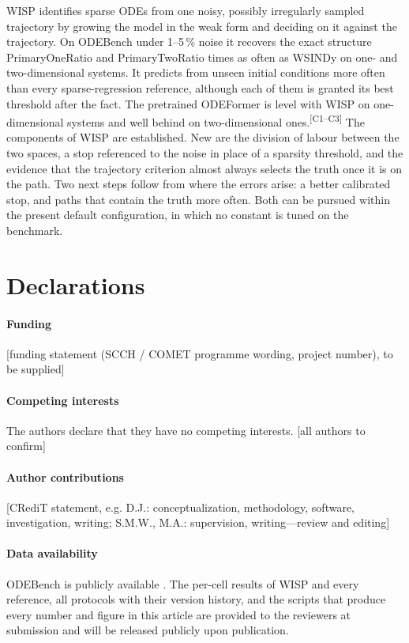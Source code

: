 \documentclass[10pt]{article}
\newcommand{\pv}[1]{\textcolor{prelim}{#1}}
\newcommand{\claimtag}[1]{\textsuperscript{\textcolor{prelim}{\sffamily\tiny[#1]}}}
\newcommand{\pv}[1]{#1}
\newcommand{\claimtag}[1]{}
\newcommand{\todo}[1]{\textcolor{prelim}{\sffamily\footnotesize[#1]}}
\newcommand{\m}[1]{\pv{\csname #1\endcsname}}            %
\begin{document}
WISP identifies sparse ODEs from one noisy, possibly irregularly sampled trajectory by growing the model in the weak form
and deciding on it against the trajectory. On ODEBench under 1--5\,\% noise it recovers the exact structure
\m{PrimaryOneRatio} and \m{PrimaryTwoRatio} times as often as WSINDy on one- and two-dimensional systems. It predicts
from unseen initial conditions more often than every sparse-regression reference, although each of them is granted its
best threshold after the fact. The pretrained ODEFormer is level with WISP on one-dimensional systems and well behind
on two-dimensional ones.\claimtag{C1--C3} The components of WISP are established. New are the division of labour
between the two spaces, a stop referenced to the noise in place of a sparsity threshold, and the evidence that the
trajectory criterion almost always selects the truth once it is on the path. Two next steps follow from where the
errors arise: a better calibrated stop, and paths that contain the truth more often. Both can be pursued within the
present default configuration, in which no constant is tuned on the benchmark.

\section*{Declarations}

\paragraph{Funding} \todo{funding statement (SCCH / COMET programme wording, project number), to be supplied}

\paragraph{Competing interests} The authors declare that they have no competing interests. \todo{all authors to confirm}

\paragraph{Author contributions} \todo{CRediT statement, e.g. D.J.: conceptualization, methodology, software,
investigation, writing; S.M.W., M.A.: supervision, writing---review and editing}

\paragraph{Data availability} ODEBench is publicly available \cite{dascoli2024}. The per-cell results of WISP and every
reference, all protocols with their version history, and the scripts that produce every number and figure in this
article are provided to the reviewers at submission and will be released publicly upon publication.
\end{document}
